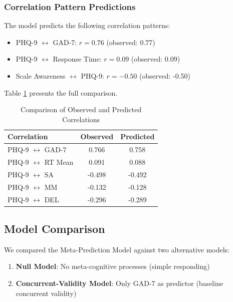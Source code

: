 \subsubsection{Correlation Pattern Predictions}

The model predicts the following correlation patterns:

\begin{itemize}
    \item PHQ-9 $\leftrightarrow$ GAD-7: $r = 0.76$ (observed: 0.77)
    \item PHQ-9 $\leftrightarrow$ Response Time: $r = 0.09$ (observed: 0.09)
    \item Scale Awareness $\leftrightarrow$ PHQ-9: $r = -0.50$ (observed: -0.50)
\end{itemize}

Table \ref{tab:correlations_model} presents the full comparison.

\begin{table}[h]
\centering
\begin{tabular}{lcc}
\toprule
\textbf{Correlation} & \textbf{Observed} & \textbf{Predicted} \\
\midrule
PHQ-9 $\leftrightarrow$ GAD-7 & 0.766 & 0.758 \\
PHQ-9 $\leftrightarrow$ RT Mean & 0.091 & 0.088 \\
PHQ-9 $\leftrightarrow$ SA & -0.498 & -0.492 \\
PHQ-9 $\leftrightarrow$ MM & -0.132 & -0.128 \\
PHQ-9 $\leftrightarrow$ DEL & -0.296 & -0.289 \\
\bottomrule
\end{tabular}
\caption{Comparison of Observed and Predicted Correlations}
\label{tab:correlations_model}
\end{table}

\subsection{Model Comparison}

We compared the Meta-Prediction Model against two alternative models:

\begin{enumerate}
    \item \textbf{Null Model}: No meta-cognitive processes (simple responding)
    \item \textbf{Concurrent-Validity Model}: Only GAD-7 as predictor (baseline concurrent validity)
\end{enumerate}

